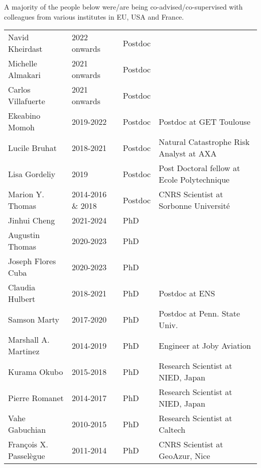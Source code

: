 A majority of the people below were/are being co-advised/co-supervised with colleagues from various institutes in EU, USA and France. 
\begin{table}[h!]
 \renewcommand{\arraystretch}{0.9}
\begin{tabular}{L{4cm}L{3cm}L{2cm}D{6cm}}
\hline
\color{groy}Navid Kheirdast       & 2022 onwards      &  Postdoc    &  \\
\color{groy}Michelle Almakari     & 2021 onwards      &  Postdoc    &  \\
\color{groy}Carlos Villafuerte    & 2021 onwards      &  Postdoc    &  \\
\color{gray}Ekeabino Momoh   	  & 2019-2022         &  Postdoc    &  Postdoc at GET Toulouse\\
\color{gray}Lucile Bruhat    	  & 2018-2021         &  Postdoc    &  Natural Catastrophe Risk Analyst at AXA\\
\color{gray}Lisa Gordeliy    	  & 2019              &  Postdoc    &  Post Doctoral fellow at Ecole Polytechnique\\
\color{gray}Marion Y. Thomas 	  & 2014-2016 \& 2018 &  Postdoc    &  CNRS Scientist at Sorbonne Université\\[12pt]
\hline
\color{groy}Jinhui Cheng          & 2021-2024		  &  PhD        &   \\
\color{groy}Augustin Thomas       & 2020-2023		  &  PhD        &   \\
\color{groy}Joseph Flores Cuba    & 2020-2023		  &  PhD        &   \\
\color{gray}Claudia Hulbert    	  & 2018-2021         &  PhD        &  Postdoc at ENS\\
\color{gray}Samson Marty    	      & 2017-2020         &  PhD        &  Postdoc at Penn. State Univ.\\
\color{gray}Marshall A. Martinez  & 2014-2019         &  PhD        &  Engineer at Joby Aviation \\
\color{gray}Kurama Okubo    	      & 2015-2018         &  PhD        &  Research Scientist at NIED, Japan\\
\color{gray}Pierre Romanet        & 2014-2017         &  PhD        &  Research Scientist at NIED, Japan\\
\color{gray}Vahe Gabuchian		  & 2010-2015         &  PhD        &  Research Scientist at Caltech\\
\color{gray}François X. Passelègue& 2011-2014         &  PhD        &  CNRS Scientist at GeoAzur, Nice\\

\end{tabular}
\end{table}
